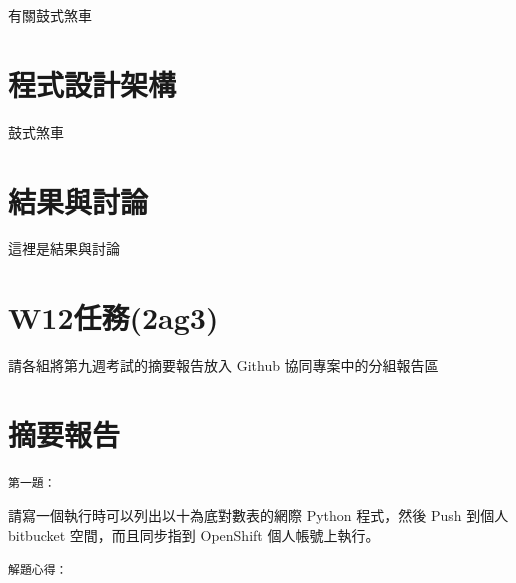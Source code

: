 \documentclass[]{article}
\newenvironment{Shaded}{}{}
\newcommand{\KeywordTok}[1]{\textcolor[rgb]{0.00,0.44,0.13}{\textbf{{#1}}}}
\newcommand{\DataTypeTok}[1]{\textcolor[rgb]{0.56,0.13,0.00}{{#1}}}
\newcommand{\DecValTok}[1]{\textcolor[rgb]{0.25,0.63,0.44}{{#1}}}
\newcommand{\CharTok}[1]{\textcolor[rgb]{0.25,0.44,0.63}{{#1}}}
\newcommand{\StringTok}[1]{\textcolor[rgb]{0.25,0.44,0.63}{{#1}}}
\newcommand{\OtherTok}[1]{\textcolor[rgb]{0.00,0.44,0.13}{{#1}}}
\newcommand{\NormalTok}[1]{{#1}}
\begin{document}
有關鼓式煞車

\section{程式設計架構}\label{ux7a0bux5f0fux8a2dux8a08ux67b6ux69cb}

鼓式煞車

\section{結果與討論}\label{ux7d50ux679cux8207ux8a0eux8ad6}

這裡是結果與討論

\section{W12任務(2ag3)}\label{w12ux4efbux52d92ag3}

請各組將第九週考試的摘要報告放入 Github 協同專案中的分組報告區

\section{摘要報告}\label{ux6458ux8981ux5831ux544a}

\begin{verbatim}
第一題：
\end{verbatim}

請寫一個執行時可以列出以十為底對數表的網際 Python 程式，然後 Push 到個人
bitbucket 空間，而且同步指到 OpenShift 個人帳號上執行。

\begin{Shaded}
\end{Shaded}

\begin{verbatim}
解題心得：
\end{verbatim}
\end{document}
